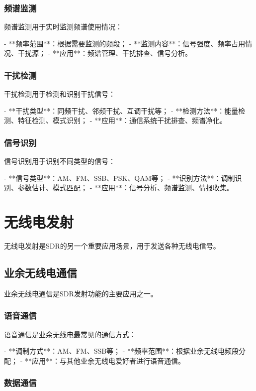 ﻿\documentclass[UTF8]{ctexbook}
\begin{document}
\subsubsection{频谱监测}

频谱监测用于实时监测频谱使用情况：

- **频率范围**：根据需要监测的频段；
- **监测内容**：信号强度、频率占用情况、干扰源；
- **应用**：频谱管理、干扰排查、信号分析。

\subsubsection{干扰检测}

干扰检测用于检测和识别干扰信号：

- **干扰类型**：同频干扰、邻频干扰、互调干扰等；
- **检测方法**：能量检测、特征检测、模式识别；
- **应用**：通信系统干扰排查、频谱净化。

\subsubsection{信号识别}

信号识别用于识别不同类型的信号：

- **信号类型**：AM、FM、SSB、PSK、QAM等；
- **识别方法**：调制识别、参数估计、模式匹配；
- **应用**：信号分析、频谱监测、情报收集。

\section{无线电发射}

无线电发射是SDR的另一个重要应用场景，用于发送各种无线电信号。

\subsection{业余无线电通信}

业余无线电通信是SDR发射功能的主要应用之一。

\subsubsection{语音通信}

语音通信是业余无线电最常见的通信方式：

- **调制方式**：AM、FM、SSB等；
- **频率范围**：根据业余无线电频段分配；
- **应用**：与其他业余无线电爱好者进行语音通信。

\subsubsection{数据通信}
\end{document}
